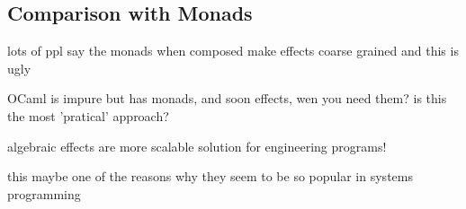 \subsection{Comparison with Monads}
lots of ppl say the monads when composed make effects coarse grained
and this is ugly

OCaml is impure but has monads, and soon effects, wen you need them?
is this the most 'pratical' approach?

algebraic effects are more scalable solution for engineering programs!

this maybe one of the reasons why they seem to be so popular in systems
programming

